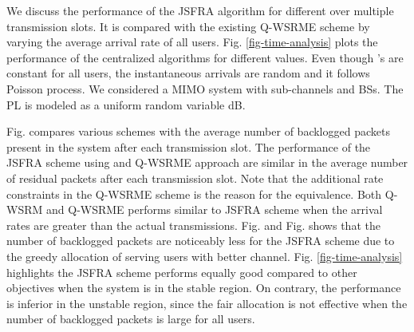 
We discuss the performance of the \ac{JSFRA} algorithm for different  over multiple transmission slots. It is compared with the existing \ac{Q-WSRME} scheme by varying the average arrival rate  of all users. Fig. \ref{fig-time-analysis} plots the performance of the centralized algorithms for different  values. Even though 's are constant for all users, the instantaneous arrivals are random and it follows Poisson process. We considered a  \ac{MIMO} system with  sub-channels and  \acp{BS}. The \ac{PL} is modeled as a uniform random variable \me{[0,-3]} dB.

Fig.  compares various schemes with the average number of backlogged packets present in the system after each transmission slot. The performance of the \ac{JSFRA} scheme using  and \ac{Q-WSRME} approach are similar in the average number of residual packets after each transmission slot. Note that the additional rate constraints in the \ac{Q-WSRME} scheme is the reason for the equivalence. Both \ac{Q-WSRM} and \ac{Q-WSRME} performs similar to  \ac{JSFRA} scheme when the arrival rates are greater than the actual transmissions. Fig.  and Fig.  shows that the number of backlogged packets are noticeably less for the  \ac{JSFRA} scheme due to the greedy allocation of serving users with better channel. Fig. \ref{fig-time-analysis} highlights the \me{\ell_{\infty}} \ac{JSFRA} scheme performs equally good compared to other objectives when the system is in the stable region. On contrary, the performance is inferior in the unstable region, since the fair allocation is not effective when the number of backlogged packets is large for all users.
